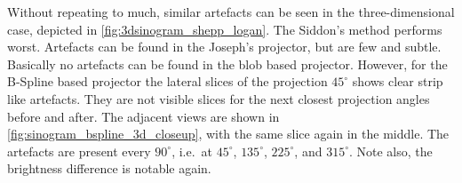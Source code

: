 Without repeating to much, similar artefacts can be seen in the three-dimensional case, depicted in
\autoref{fig:3dsinogram_shepp_logan}. The Siddon's method performs worst. Artefacts can be found in
the Joseph's projector, but are few and subtle. Basically no artefacts can be found in the blob
based projector. However, for the B-Spline based projector the lateral slices of the projection
\(45^\circ\) shows clear strip like artefacts. They are not visible slices for the next closest
projection angles before and after. The adjacent views are shown in
\autoref{fig:sinogram_bspline_3d_closeup}, with the same slice again in the middle. The artefacts
are present every \(90^\circ\), i.e.\ at \(45^\circ\), \(135^\circ\), \(225^\circ\), and
\(315^\circ\). Note also, the brightness difference is notable again.

\begin{figure}[h]
	\centering



\end{figure}
